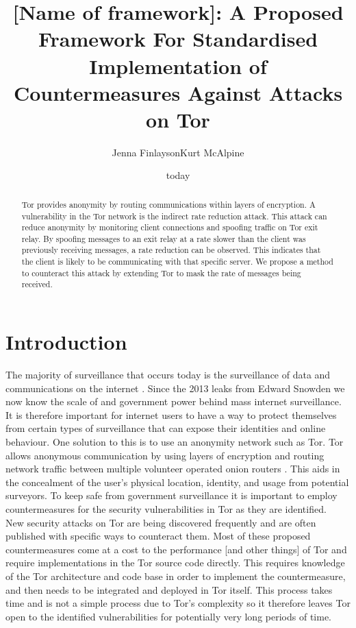 \documentclass[9pt,technote]{IEEEtran}
\title{[Name of framework]: A Proposed Framework For Standardised Implementation of Countermeasures Against Attacks on Tor}
\date{today}
\author{Jenna FinlaysonKurt McAlpine}
\begin{document}
 
\maketitle

\begin{abstract} Tor provides anonymity by routing communications within layers
of encryption. A vulnerability in the Tor network is the indirect rate reduction
attack. This attack can reduce anonymity by monitoring client connections and
spoofing traffic on Tor exit relay. By spoofing messages to an exit relay at a
rate slower than the client was previously receiving messages, a rate reduction
can be observed. This indicates that the client is likely to be communicating
with that specific server. We propose a method to counteract this attack by
extending Tor to mask the rate of messages being received. \end{abstract}

\section{Introduction} 
The majority of surveillance that occurs today is the
surveillance of data and communications on the internet
\cite{diffie2008brave}. Since the 2013 leaks from Edward Snowden we now know the scale of and government power behind mass internet
surveillance. It is therefore important for internet users to have a way to
protect themselves from certain types of surveillance that can expose their identities and online behaviour. One solution to this is to use an anonymity network such as Tor. Tor allows anonymous communication by using layers of encryption and routing network
traffic between multiple volunteer operated onion routers \cite{tor}. This aids in the concealment of the
user's physical location, identity, and usage from potential surveyors. To keep
safe from government surveillance it is important to employ countermeasures for the security
vulnerabilities in Tor as they are identified.\\

New security attacks on Tor are being discovered frequently and are often published with specific ways to counteract them. Most of these proposed countermeasures come at a cost to the performance [and other things] of Tor and require implementations in the Tor source code directly. This requires knowledge of the Tor architecture and code base in order to implement the countermeasure, and then needs to be integrated and deployed in Tor itself. This process takes time and is not a simple process due to Tor's complexity so it therefore leaves Tor open to the identified vulnerabilities for potentially very long periods of time. \\
\end{document}
